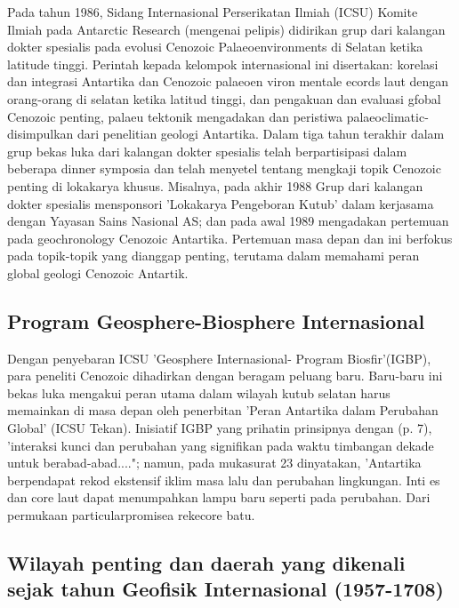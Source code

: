 		Pada tahun 1986, Sidang Internasional Perserikatan Ilmiah (ICSU) Komite Ilmiah pada Antarctic Research (mengenai pelipis) didirikan grup dari 
	kalangan dokter spesialis pada evolusi Cenozoic Palaeoenvironments di Selatan ketika latitude tinggi. Perintah kepada kelompok internasional ini 
	disertakan: korelasi dan integrasi Antartika dan Cenozoic palaeoen viron mentale ecords laut dengan orang-orang di selatan ketika latitud 
	tinggi, dan pengakuan dan evaluasi gfobal Cenozoic penting, palaeu tektonik mengadakan dan peristiwa palaeoclimatic-disimpulkan dari penelitian 
	geologi Antartika. Dalam tiga tahun terakhir dalam grup bekas luka dari kalangan dokter spesialis telah berpartisipasi dalam beberapa dinner symposia 
	dan telah menyetel tentang mengkaji topik Cenozoic penting di lokakarya khusus. Misalnya, pada akhir 1988 Grup dari kalangan dokter spesialis 
	mensponsori 'Lokakarya Pengeboran Kutub' dalam kerjasama dengan Yayasan Sains Nasional AS; dan pada awal 1989 mengadakan pertemuan pada geochronology 
	Cenozoic Antartika. Pertemuan masa depan dan ini berfokus pada topik-topik yang dianggap penting, terutama dalam memahami peran global 
	geologi Cenozoic Antartik.
	
	
\subsection{Program Geosphere-Biosphere Internasional}

		Dengan penyebaran ICSU 'Geosphere Internasional- Program Biosfir'(IGBP), para peneliti Cenozoic dihadirkan dengan beragam peluang baru. 
	Baru-baru ini bekas luka mengakui peran utama dalam wilayah kutub selatan harus memainkan di masa depan oleh penerbitan 'Peran Antartika dalam 
	Perubahan Global' (ICSU Tekan). Inisiatif IGBP yang prihatin prinsipnya dengan (p. 7), 'interaksi kunci dan perubahan yang signifikan pada waktu 
	timbangan dekade untuk berabad-abad...."; namun, pada mukasurat 23 dinyatakan, 'Antartika berpendapat rekod ekstensif iklim masa lalu dan perubahan lingkungan. 
	Inti es dan core laut dapat menumpahkan lampu baru seperti pada perubahan. Dari permukaan particularpromisea rekecore batu.
	
	
\subsection{Wilayah penting dan daerah yang dikenali sejak tahun Geofisik Internasional (1957-1708)}

